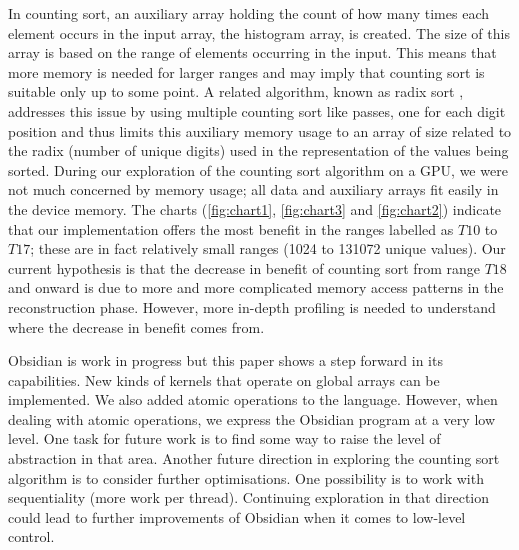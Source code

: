 In counting sort, an auxiliary array holding the count of how many times 
each element occurs in the input array, the histogram array, is created. 
The size of this array is 
based on the range of elements occurring in the input. This means that 
more memory is needed for larger ranges and may imply that counting sort 
is suitable only up to some point. A related algorithm, known as radix 
sort , addresses this issue by using multiple counting sort 
like passes, one for each digit position and thus limits this auxiliary 
memory usage to an array of size related to the radix (number of unique 
digits) used in the representation of the values being sorted. During 
our exploration of the counting sort algorithm on a GPU, we were not much 
concerned by memory usage; all data and auxiliary 
arrays fit easily in the device memory. The charts (\ref{fig:chart1}, \ref{fig:chart3} and \ref{fig:chart2}) indicate that our implementation offers the most 
benefit in the ranges labelled as $T10$ to $T17$; these are in fact relatively 
small ranges (1024 to 131072 unique values). Our current hypothesis 
is that the decrease in benefit of counting sort from range $T18$ and onward
is due to more and more complicated memory access patterns in the 
reconstruction phase. However, more in-depth profiling is needed to 
understand where the decrease in benefit comes from.

Obsidian is work in progress but this paper shows a step forward in its
capabilities. New kinds of kernels that operate on global arrays can be 
implemented. We also added atomic operations to the language. However, 
when dealing with atomic operations, we express the Obsidian program 
at a very low level. 
One task for future work is to find some way to raise 
the level of abstraction in that area. Another future direction in exploring 
the counting sort algorithm is to consider further optimisations.
One possibility is to work with sequentiality 
(more work per thread). Continuing exploration in that direction could lead 
to further improvements of Obsidian when it comes to low-level control.  

